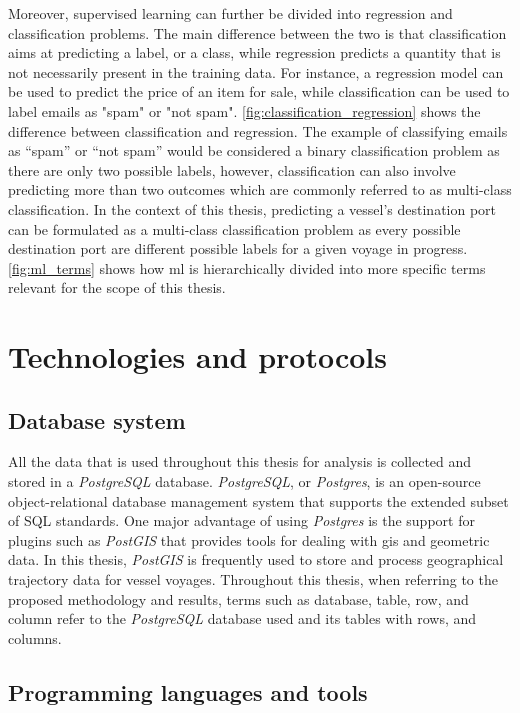 Moreover, supervised learning can further be divided into regression and classification problems. The main difference between the two is that classification aims at predicting a label, or a class, while regression predicts a quantity that is not necessarily present in the training data. For instance, a regression model can be used to predict the price of an item for sale, while classification can be used to label emails as "spam" or "not spam". \cref{fig:classification_regression} shows the difference between classification and regression. The example of classifying emails as ``spam'' or ``not spam'' would be considered a binary classification problem as there are only two possible labels, however, classification can also involve predicting more than two outcomes which are commonly referred to as multi-class classification. In the context of this thesis, predicting a vessel's destination port can be formulated as a multi-class classification problem as every possible destination port are different possible labels for a given voyage in progress. \cref{fig:ml_terms} shows how \acrshort{ml} is hierarchically divided into more specific terms relevant for the scope of this thesis.


\section{Technologies and protocols}

\subsection{Database system}

All the data that is used throughout this thesis for analysis is collected and stored in a \textit{PostgreSQL} database. \textit{PostgreSQL}, or \textit{Postgres}, is an open-source object-relational database management system that supports the extended subset of SQL standards. One major advantage of using \textit{Postgres} is the support for plugins such as \textit{PostGIS} that provides tools for dealing with \acrshort{gis} and geometric data. In this thesis, \textit{PostGIS} is frequently used to store and process geographical trajectory data for vessel voyages. Throughout this thesis, when referring to the proposed methodology and results, terms such as database, table, row, and column refer to the \textit{PostgreSQL} database used and its tables with rows, and columns.

\subsection{Programming languages and tools}

